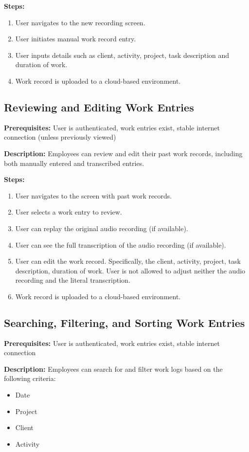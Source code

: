 \documentclass[
  digital,     %
  oneside,     %
  nosansbold,  %
  nocolorbold, %
  lof,         %
  lot,         %
]{fithesis4}
\begin{document}
\noindent \textbf{Steps:}
\begin{enumerate}
    \item User navigates to the new recording screen.
    \item User initiates manual work record entry.
    \item User inputs details such as client, activity, project, task description and duration of work.
    \item Work record is uploaded to a cloud-based environment.
\end{enumerate}

\subsection{Reviewing and Editing Work Entries}

\noindent \textbf{Prerequisites:} User is authenticated, work entries exist, stable internet connection (unless previously viewed)

\noindent \textbf{Description:}  
Employees can review and edit their past work records, including both manually entered and transcribed entries.

\noindent \textbf{Steps:}
\begin{enumerate}
    \item User navigates to the screen with past work records.
    \item User selects a work entry to review.
    \item User can replay the original audio recording (if available).
    \item User can see the full transcription of the audio recording (if available).
    \item User can edit the work record. Specifically, the client, activity, project, task description, duration of work. User is not allowed to adjust neither the audio recording and the literal transcription.
    \item Work record is uploaded to a cloud-based environment.
\end{enumerate}

\subsection{Searching, Filtering, and Sorting Work Entries}

\noindent \textbf{Prerequisites:} User is authenticated, work entries exist, stable internet connection

\noindent \textbf{Description:}  
Employees can search for and filter work logs based on the following criteria:
\begin{itemize}
    \item Date
    \item Project
    \item Client
    \item Activity
\end{itemize}
\end{document}
